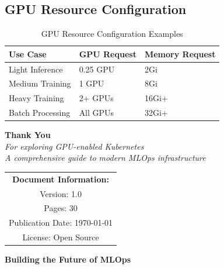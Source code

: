 \documentclass[12pt,a4paper]{report}
\begin{document}
\subsection{GPU Resource Configuration}
\begin{table}[h]
    \centering
    \caption{GPU Resource Configuration Examples}
    \label{tab:gpu-config}
    \begin{tabular}{@{}lll@{}}
        \toprule
        \textbf{Use Case} & \textbf{GPU Request} & \textbf{Memory Request} \\
        \midrule
        Light Inference & 0.25 GPU & 2Gi \\
        Medium Training & 1 GPU & 8Gi \\
        Heavy Training & 2+ GPUs & 16Gi+ \\
        Batch Processing & All GPUs & 32Gi+ \\
        \bottomrule
    \end{tabular}
\end{table}

\begin{titlepage}
    \centering
    \vspace*{3cm}
    
    \begin{center}
        {\color{primarycolor}\Huge\textbf{Thank You}}\\[1cm]
        
        {\Large\textit{For exploring GPU-enabled Kubernetes}}\\[0.5cm]
        
        {\large\textit{A comprehensive guide to modern MLOps infrastructure}}\\[1cm]
        
        \begin{tabular}{c}
            \textbf{Document Information:}\\[0.5cm]
            Version: 1.0\\[0.2cm]
            Pages: 30\\[0.2cm]
            Publication Date: \today\\[0.2cm]
            License: Open Source
        \end{tabular}
    \end{center}
    
    \vfill
    
    \begin{center}
        \colorbox{accentcolor}{
            \color{white}\textbf{Building the Future of MLOps}
        }
    \end{center}
\end{titlepage}
\end{document}
